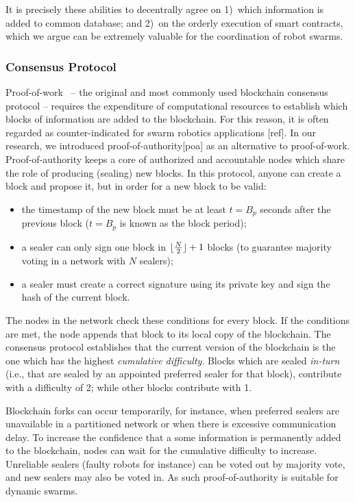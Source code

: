 \documentclass[runningheads]{llncs}
\DeclarePairedDelimiter\floor{\lfloor}{\rfloor}
\newcommand{\poa}{proof-of-authority\xspace}
\newcommand{\Poa}{Proof-of-authority\xspace}
\newcommand{\pow}{proof-of-work\xspace}
\newcommand{\Pow}{Proof-of-work\xspace}
\begin{document}
It is precisely these abilities to decentrally agree on 1)~which information is added to common database; and 2)~on the orderly execution of smart contracts, which we argue can be extremely valuable for the coordination of robot swarms.

\subsubsection{Consensus Protocol}
\label{sec:consensus-protocol}
\Pow~\cite{Nak2008:techreport} -- the original and most commonly used blockchain consensus protocol -- requires the expenditure of computational resources to establish which blocks of information are added to the blockchain. For this reason, it is often regarded as counter-indicated for swarm robotics applications [ref].
In our research, we introduced \poa [poa] as an alternative to \pow. \Poa keeps a core of authorized and accountable nodes which share the role of producing (sealing) new blocks. In this protocol, anyone can create a block and propose it, but in order for a new block to be valid:
\begin{itemize}
\item the timestamp of the new block must be at least $t=B_p$ seconds
  after the previous block ($t=B_p$ is known as the block period);
\item a sealer can only sign one block in $\floor{\frac{N}{2}} + 1$ blocks
  (to guarantee majority voting in a network with $N$ sealers);
\item a sealer must create a correct signature using its private key and sign the hash of the current block.
\end{itemize}
The nodes in the network check these conditions for every block. If the conditions are met, the node appends that block to its local copy of the blockchain. The consensus protocol establishes that the current version of the blockchain is the one which has the highest \emph{cumulative difficulty}. Blocks which are sealed \emph{in-turn} (i.e., that are sealed by an appointed preferred sealer for that block), contribute with a difficulty of 2; while other blocks contribute with 1.

 Blockchain forks can occur temporarily, for instance, when preferred sealers are unavailable in a partitioned network or when there is excessive communication delay. To increase the confidence that a some information is permanently added to the blockchain, nodes can wait for the cumulative difficulty to increase. Unreliable sealers (faulty robots for instance) can be voted out by majority vote, and new sealers may also be voted in. As such \poa is suitable for dynamic swarms.
\end{document}
